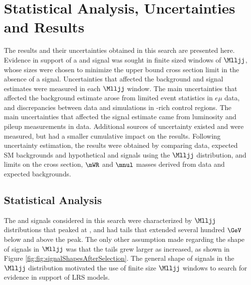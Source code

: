 \chapter{Statistical Analysis, Uncertainties and Results}
\label{statAnalysis_uncerts_results}
The results and their uncertainties obtained in this search are presented here.  Evidence in 
support of a \WR and \nul signal was sought in finite sized windows of $\Mlljj$, whose sizes 
were chosen to minimize the upper bound \WR cross section limit in the absence of a signal.  
Uncertainties that affected the background and signal estimates were measured in each $\Mlljj$ 
window.  The main uncertainties that affected the background estimate arose from limited event 
statistics in $e\mu$ data, and discrepancies between data and simulations in \DY-rich control 
regions.  The main uncertainties that affected the signal estimate came from luminosity and 
pileup measurements in data.  Additional sources of uncertainty existed and were measured, 
but had a smaller cumulative impact on the results.  Following uncertainty estimation, the 
results were obtained by comparing data, expected SM backgrounds and hypothetical 
\WR and \nul signals using the $\Mlljj$ distribution, and limits on the \WR cross section, 
$\mWR$ and $\mnul$ masses derived from data and expected backgrounds.

\section{Statistical Analysis}
\label{sec:massWindows}
The \WR and \nul signals considered in this search were characterized by $\Mlljj$ distributions 
that peaked at \mWR, and had tails that extended several hundred $\GeV$ below and above the 
peak.  The only other assumption made regarding the shape of signals in $\Mlljj$ was that 
the tails grew larger as \mWR increased, as shown in Figure \ref{fig:fig:signalShapesAfterSelection}.  
The general shape of \WR signals in the $\Mlljj$ distribution motivated the use of finite 
size $\Mlljj$ windows to search for evidence in support of LRS models.

